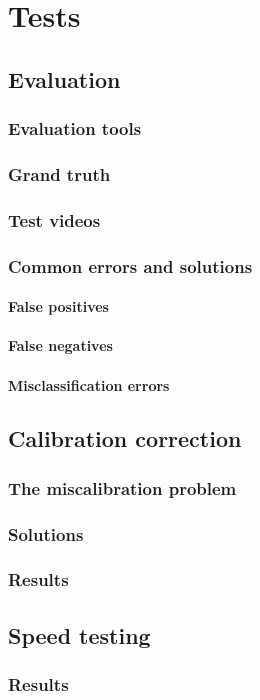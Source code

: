 \chapter{Tests}\label{chap:Tets}
\section{Evaluation}

\subsection{Evaluation tools}
\subsection{Grand truth}
\subsection{Test videos}

\subsection{Common errors and solutions}
\subsubsection{False positives}
\subsubsection{False negatives}
\subsubsection{Misclassification errors}

\section{Calibration correction}

\subsection{The miscalibration problem}
\subsection{Solutions}
\subsection{Results}

\section{Speed testing}

\subsection{Results}
